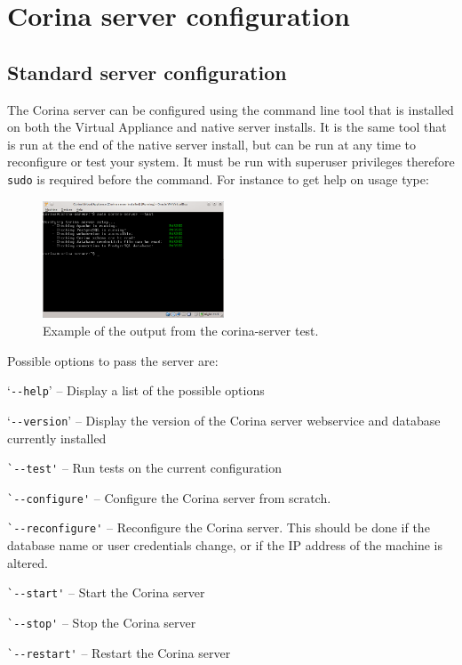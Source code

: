 \section{Corina server configuration}
\label{txt:serverConfig}
\subsection{Standard server configuration}
The Corina server can be configured using the command line tool that is installed on both the Virtual Appliance and native server installs.  It is the same tool that is run at the end of the native server install, but can be run at any time to reconfigure or test your system.  It must be run with superuser privileges therefore \verb|sudo| is required before the command.  For instance to get help on usage type:


\begin{figure}
  \begin{center}
    \includegraphics[width=0.48\textwidth]{Images/corina-server-terminal.png}
  \end{center}
  \caption{Example of the output from the corina-server test.}
  \label{fig:serverTerminal}
\end{figure}

Possible options to pass the server are:

\begin{itemize*}
 \item `\verb|--help|' -- Display a list of the possible options
 \item `\verb|--version|' -- Display the version of the Corina server webservice and database currently installed
 \item \verb|`--test'| -- Run tests on the current configuration
 \item \verb|`--configure'| -- Configure the Corina server from scratch.  
 \item \verb|`--reconfigure'| -- Reconfigure the Corina server.  This should be done if the database name or user credentials change, or if the IP address of the machine is altered.
 \item \verb|`--start'| -- Start the Corina server
 \item \verb|`--stop'| -- Stop the Corina server
 \item \verb|`--restart'| -- Restart the Corina server
\end{itemize*} 

